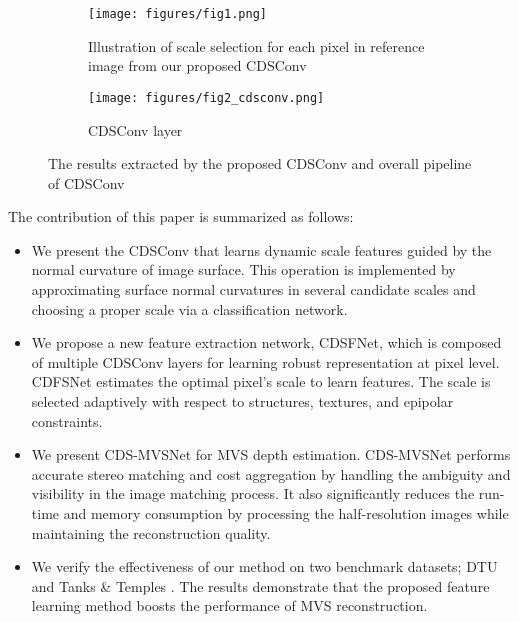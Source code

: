\documentclass{article} \usepackage{iclr2022_conference,times}
\begin{document}
\begin{figure*}[t]
\begin{subfigure}{0.35\linewidth}
\centering
\texttt{[image: figures/fig1.png]}
\caption{Illustration of scale selection for each pixel in reference image from our proposed CDSConv}
\label{fig1a}
\end{subfigure}
\hfill
\begin{subfigure}{0.65\linewidth}
\centering
\texttt{[image: figures/fig2\_cdsconv.png]}
\caption{CDSConv layer}
\label{fig1b}
\end{subfigure}
\hfill
\vspace{-0.25cm}
\caption{The results extracted by the proposed CDSConv and overall pipeline of CDSConv}
\label{fig1}
\vspace{-0.5cm}
\end{figure*}

The contribution of this paper is summarized as follows:
\begin{itemize}
    \item We present the CDSConv that learns dynamic scale features guided by the normal curvature of image surface. This operation is implemented by approximating surface normal curvatures in several candidate scales and choosing a proper scale via a classification network.
    \item We propose a new feature extraction network, CDSFNet, which is composed of multiple CDSConv layers for learning robust representation at pixel level. CDFSNet estimates the optimal pixel’s scale to learn features. The scale is selected adaptively with respect to structures, textures, and epipolar constraints.
    \item We present CDS-MVSNet for MVS depth estimation. CDS-MVSNet performs accurate stereo matching and cost aggregation by handling the ambiguity and visibility in the image matching process. It also significantly reduces the run-time and memory consumption by processing the half-resolution images while maintaining the reconstruction quality.
    \item We verify the effectiveness of our method on two benchmark datasets; DTU \citep{aanaes2016large} and Tanks \& Temples \citep{knapitsch2017tanks}. The results demonstrate that the proposed feature learning method boosts the performance of MVS reconstruction.
\end{itemize}
\end{document}
